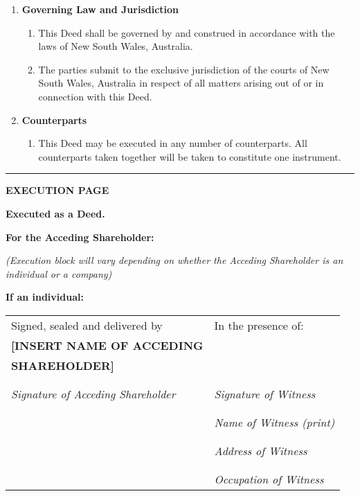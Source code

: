 \begin{enumerate}
    \item \textbf{Governing Law and Jurisdiction}
    \begin{enumerate}[label=(\alph*)]
        \item This Deed shall be governed by and construed in accordance with the laws of New South Wales, Australia.
        \item The parties submit to the exclusive jurisdiction of the courts of New South Wales, Australia in respect of all matters arising out of or in connection with this Deed.
    \end{enumerate}

    \item \textbf{Counterparts}
    \begin{enumerate}[label=(\alph*)]
        \item This Deed may be executed in any number of counterparts. All counterparts taken together will be taken to constitute one instrument.
    \end{enumerate}
\end{enumerate}

\vspace{1em}
\hrule
\vspace{1em}

\textbf{EXECUTION PAGE}

\textbf{Executed as a Deed.}

\vspace{2em}

\textbf{For the Acceding Shareholder:}

\begin{center}
\textit{(Execution block will vary depending on whether the Acceding Shareholder is an individual or a company)}
\end{center}

\vspace{1em}

\textbf{If an individual:}

\begin{tabular}{p{8cm}p{8cm}}
Signed, sealed and delivered by & In the presence of: \\
\textbf{[INSERT NAME OF ACCEDING} & \\
\textbf{SHAREHOLDER]} & \\
& \\
\cline{1-1}\cline{2-2} \\
\textit{Signature of Acceding Shareholder} & \textit{Signature of Witness} \\
& \\
& \cline{2-2} \\
& \textit{Name of Witness (print)} \\
& \\
& \cline{2-2} \\
& \textit{Address of Witness} \\
& \\
& \cline{2-2} \\
& \textit{Occupation of Witness} \\
\end{tabular}

